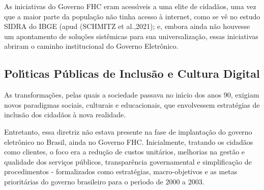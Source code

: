 \documentclass[
12pt,		%
openright,	%
twoside,  %
a4paper,			%
chapter=TITLE,		%
english,			%
french,				%
spanish,			%
brazil				%
]{USPSC-classe/USPSC}
\begin{document}
As iniciativas do Governo FHC eram  acess\'{\i}veis a uma elite de cidad\~aos, uma vez que a maior parte da popula\c{c}\~ao n\~ao tinha acesso \`a internet, como se v\^e no estudo SIDRA do IBGE (apud (SCHMITZ et al.,2021); e, embora ainda n\~ao houvesse um apontamento de solu\c{c}\~oes sist\^emicas para sua universaliza\c{c}\~ao, essas iniciativas abriram o caminho institucional do Governo Eletr\^onico.

















\subsection[Pol\'{\i}ticas P\'ublicas de Inclus\~ao e Cultura Digital]{Pol\'{\i}ticas P\'ublicas de Inclus\~ao e Cultura Digital}\label{Pol\'{\i}ticas P\'ublicas de Inclus\~ao e Cultura Digital}
As transforma\c{c}\~oes, pelas quais a sociedade passava no in\'{\i}cio dos anos 90, exigiam novos paradigmas sociais, culturais e educacionais, que envolvessem estrat\'egias de inclus\~ao dos  cidad\~aos \`a nova realidade.

















Entretanto, essa diretriz n\~ao estava presente na fase de implanta\c{c}\~ao do governo eletr\^onico no Brasil, ainda no Governo FHC. Inicialmente, tratando os cidad\~aos como clientes, o foco era a redu\c{c}\~ao de custos unit\'arios, melhorias na gest\~ao e qualidade dos servi\c{c}os p\'ublicos, transpar\^encia governamental e simplifica\c{c}\~ao de procedimentos - formalizados como estrat\'egias, macro-objetivos e  as metas priorit\'arias  do governo brasileiro para o per\'{\i}odo de 2000 a 2003.
\end{document}
